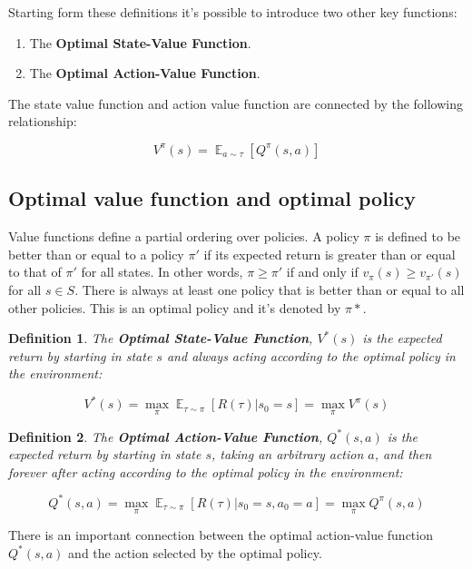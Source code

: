 \documentclass{article}
\newtheorem{definition}{Definition}
\DeclareMathOperator*{\E}{\mathbb{E}}
\begin{document}
Starting form these definitions it's possible to introduce two other key functions:

\begin{enumerate}
	\item The \textbf{Optimal State-Value Function}.
	\item The \textbf{Optimal Action-Value Function}.
\end{enumerate}

The state value function and action value function are connected by the following relationship:

\begin{equation}
V^\pi(s) = \E_{a \sim \tau}[Q^\pi (s,a)]
\end{equation}

\subsection{Optimal value function and optimal policy }
Value functions define a partial ordering over policies. A policy $\pi$ is defined to be better than or equal to a policy $\pi'$ if its expected return is greater than or equal to that of $\pi'$ for all states. In other words, $\pi \geq \pi'$ if and only if $v_\pi(s) \geq v_{\pi'}(s)$ for all $s \in S$. There is always at least one policy that is better than or equal to all other policies. This is an optimal policy and it's denoted by $\pi*$.

\begin{definition}
	The \textbf{Optimal State-Value Function}, $V^*(s)$ is the expected return by starting in state $s$ and always acting according to the \textit{optimal} policy in the environment:
	
	\begin{equation}
		V^{*}(s) = \max_\pi \E_{\tau \sim \pi} [R(\tau)| s_0 = s] = \max_\pi V^\pi(s)
	\end{equation}
\end{definition}

\begin{definition}
	The \textbf{Optimal Action-Value Function}, $Q^*(s,a)$ is the expected return by starting in state $s$, taking an arbitrary action $a$, and then forever after acting according to the \textit{optimal} policy in the environment:
	
	\begin{equation}
	Q^*(s,a) = \max_{\pi} \E_{\tau \sim \pi}{[R(\tau)| s_0 = s, a_0 = a]} = \max_\pi Q^\pi(s,a)
	\end{equation}
	
\end{definition}
There is an important connection between the optimal action-value function $Q^*(s,a)$ and the action selected by the optimal policy.
\end{document}
